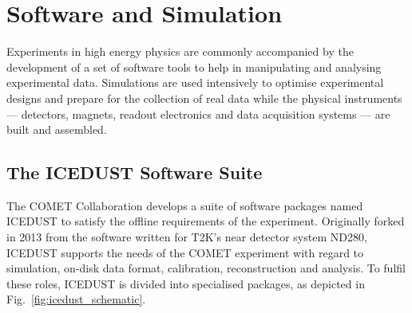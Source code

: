 \chapter{Software and Simulation}\label{chapter3}

\newcommand{\SimG}{\texttt{SimG4}\xspace}
\newcommand{\oaEvent}{\texttt{oaEvent}\xspace}
\newcommand{\Geant}{{\sc Geant4}\xspace}


 
    
    
    



Experiments in high energy physics are commonly accompanied by the development of a set of software tools to help in manipulating and analysing experimental data. Simulations are used intensively to optimise experimental designs and prepare for the collection of real data while the physical instruments --- detectors, magnets, readout electronics and data acquisition systems --- are built and assembled.

\section{The ICEDUST Software Suite}
The COMET Collaboration develops a suite of software packages named ICEDUST to satisfy the offline requirements of the experiment. Originally forked in 2013 from the software written for T2K's near detector system ND280, ICEDUST supports the needs of the COMET experiment with regard to simulation, on-disk data format, calibration, reconstruction and analysis.
To fulfil these roles, ICEDUST is divided into specialised packages, as depicted in Fig.~\ref{fig:icedust_schematic}.


